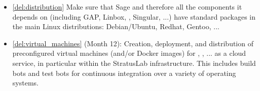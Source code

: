 \begin{Workpackage}{\thewpno}
\begin{WPDeliverables}


    \begin{itemize}




    \item \ref{del:distribution} Make sure that Sage and therefore all the
      components it depends on (including GAP, Linbox, \PariGP, Singular,
      ...)  have standard packages in the main Linux distributions:
      Debian/Ubuntu, Redhat, Gentoo, ...


    \item \ref{del:virtual_machines} (Month 12): Creation, deployment,
      and distribution of preconfigured virtual machines (and/or
      Docker images) for \PariGP, \Sage, ... as a cloud service, in
      particular within the StratusLab infrastructure. This includes
      build bots and test bots for continuous integration over a
      variety of operating systems.


\end{itemize}
\end{WPDeliverables}
\end{Workpackage}
